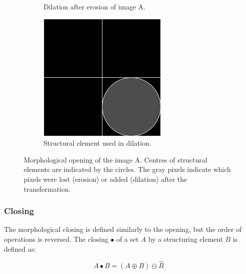 \documentclass[
  digital,     %
  oneside,     %
  nosansbold,  %
  nocolorbold, %
  lof,         %
  lot,         %
]{fithesis4}
\begin{document}
\begin{figure}
\begin{subfigure}[t]{0.4\textwidth}
        \caption{Dilation after erosion of image A.}
        \label{fig:opening_dilation}
    \end{subfigure}
    \begin{subfigure}[t]{0.2\textwidth}
        \centering
        \includegraphics[width=\textwidth]{resources/inkscape/opening_dilation_se.png}
        \caption{Structural element used in dilation.}
        \label{fig:closing_dilation_se}
    \end{subfigure}
    \caption{Morphological opening of the image A. Centres of structural
    elements are indicated by the circles. The gray pixels indicate which pixels
    were lost (erosion) or added (dilation) after the transformation.}
    \label{fig:opening}
\end{figure}

\subsubsection{Closing}

The morphological closing is defined similarly to the opening, but the order of
operations is reversed. The closing $\bullet$ of a set $A$ by a structuring
element $B$ is defined as\cite{soile2004}:

$$A \bullet B = (A \oplus B) \ominus \hat{B} $$
\end{document}
